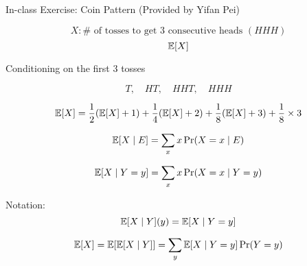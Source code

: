 \begin{frame}{}
  \begin{exampleblock}{In-class Exercise: Coin Pattern (Provided by Yifan Pei)}

    \vspace{-0.50cm}
    \[
      X: \# \text{ of tosses to get $3$ consecutive heads } (HHH)
    \]
    \[
      \operatorname*{\mathbb{E}}[X]
    \]
  \end{exampleblock}

  \pause
  \vspace{0.30cm}
  \centerline{Conditioning on the first $3$ tosses}

  \pause
  \vspace{-0.40cm}
  \[
    T, \quad HT, \quad HHT, \quad HHH
  \]

  \pause
  \vspace{-0.40cm}
  \[
    \operatorname*{\mathbb{E}}[X] = \frac{1}{2} (\operatorname*{\mathbb{E}}[X] + 1) + \frac{1}{4} (\operatorname*{\mathbb{E}}[X] + 2) + \frac{1}{8} (\operatorname*{\mathbb{E}}[X] + 3) + \frac{1}{8} \times 3
  \]
\end{frame}

\begin{frame}{}
  \begin{definition}
    \[
      \operatorname*{\mathbb{E}}[X \mid E] = \sum_{x} x \Pr(X = x \mid E)
    \]
  \end{definition}

  \pause
  \begin{definition}
    \[
      \operatorname*{\mathbb{E}}[X \mid Y = y] = \sum_{x} x \Pr(X = x \mid Y = y)
    \]
  \end{definition}

  \pause
  \begin{alertblock}{Notation:}
    \[
      \operatorname*{\mathbb{E}}[X \mid Y](y) = \operatorname*{\mathbb{E}}[X \mid Y = y]
    \]
  \end{alertblock}

  \pause
  \begin{theorem}
    \[
      \operatorname*{\mathbb{E}}[X] = \operatorname*{\mathbb{E}}[\operatorname*{\mathbb{E}}[X \mid Y]] = \sum_{y} \operatorname*{\mathbb{E}}[X \mid Y = y] \Pr(Y = y)
    \]
  \end{theorem}
\end{frame}
